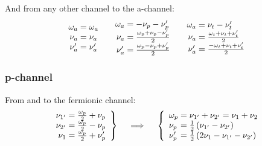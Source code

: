 \documentclass[12pt,a4paper,roman]{article}
\begin{document}
And from any other channel to the a-channel:
\begin{align}
    \begin{array}{r@{\mskip\thickmuskip}l}
    \omega_a &= \omega_a\\
    \nu_a  &= \nu_a \\
    \nu'_a &= \nu'_a\\
  \end{array}
  \quad  \begin{array}{r@{\mskip\thickmuskip}l}
    \omega_a &= -\nu_p-\nu'_p\\
    \nu_a  &= \frac{\omega_p+\nu_p-\nu'_p}{2}\\
    \nu'_a &= \frac{\omega_p-\nu_p+\nu'_p}{2}\\
  \end{array} \quad
  \begin{array}{r@{\mskip\thickmuskip}l}
    \omega_a &= \nu_t-\nu'_t\\
    \nu_a  &= \frac{ \omega_t+\nu_t+\nu'_t}{2}\\
    \nu'_a &= \frac{-\omega_t+\nu_t+\nu'_t}{2}\\
  \end{array}
  \label{eq:AtoAll}
\end{align}


\subsubsection*{p-channel}
From and to the fermionic channel:
\begin{align}
    \left.\begin{array}{r@{\mskip\thickmuskip}l}
    \nu_{1'} &= \frac{\omega_p}{2} + \nu_p \\
    \nu_{2'} &= \frac{\omega_p}{2} - \nu_p \\
    \nu_{1}  &= \frac{\omega_p}{2} + \nu'_p\\
  \end{array} \right\}
  \quad \implies \quad
  \left\{\begin{array}{l@{\mskip\thickmuskip}l}
    \omega_p &= \nu_{1'} + \nu_{2'} = \nu_{1} + \nu_{2}\\
    \nu_p    &= \frac{1}{2}\left(\nu_{1'}-\nu_{2'}\right) \\
    \nu'_p   &= \frac{1}{2}\left(2\nu_{1}-\nu_{1'}-\nu_{2'}\right)\\
  \end{array}\right.
  \label{eq:PtoF}
\end{align}
\end{document}

